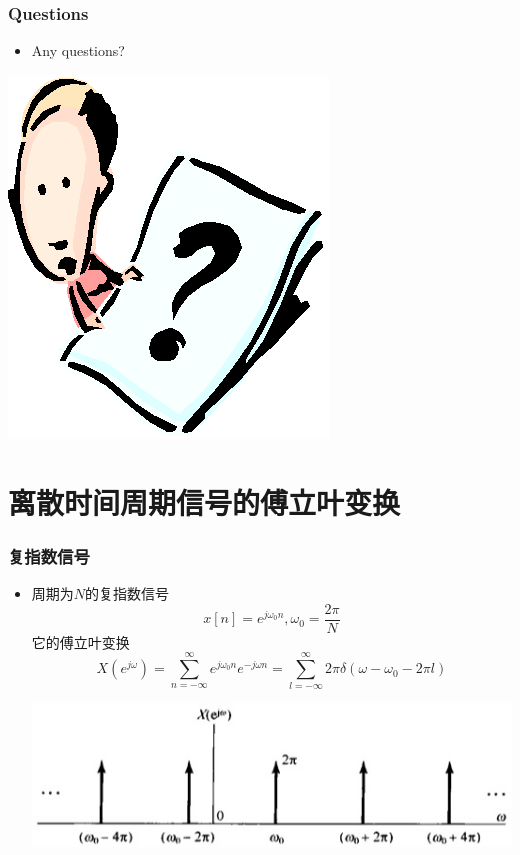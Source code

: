 \documentclass[CJKutf8,xcolor=pdftex,dvipsnames,table]{beamer}
\begin{document}
\begin{CJK*}{UTF8}{song}
\begin{frame}
  \end{frame}    
        
  \begin{frame}
    \frametitle{Questions}
    \begin{itemize}
    \item Any questions?
    \end{itemize}
    \begin{center}
      \includegraphics[scale=.5]{question}
    \end{center}
  \end{frame}     
  
  \section{离散时间周期信号的傅立叶变换}

  \begin{frame}
    \frametitle{复指数信号}
    \begin{itemize}
    \item 周期为$N$的复指数信号
    \[
    	x[n]=e^{j\omega_0 n}, \omega_0=\frac{2\pi}{N}
    \]
    它的傅立叶变换
    \[
    	X(e^{j\omega})=\sum_{n=-\infty}^{\infty}e^{j\omega_0 n}e^{-j\omega n}=\sum_{l=-\infty}^{\infty}2\pi \delta(\omega - \omega_0 - 2\pi l)
    \]
    	\begin{center}
    	\includegraphics[scale=.4]{ss-c-f5-8}
    	\end{center}  


\end{itemize}
\end{frame}
\end{CJK*}
\end{document}
